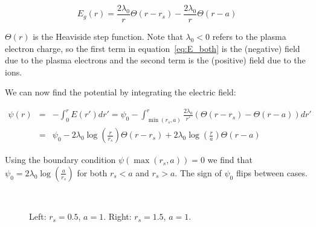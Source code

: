 \documentclass[aps,prl,preprint,groupedaddress]{revtex4-1}
\begin{document}
\begin{equation}\label{eq:E_both}
E_g(r) = \frac{2\lambda_0}{r}\Theta(r-r_s) - \frac{2\lambda_0}{r}\Theta(r-a)
\end{equation}

$\Theta(r)$ is the Heaviside step function. Note that $\lambda_0 < 0$ refers to the plasma electron charge, so the first term in equation~\ref{eq:E_both} is the (negative) field due to the plasma electrons and the second term is the (positive) field due to the ions.

We can now find the potential by integrating the electric field:

\begin{equation}\label{eq:Psi_both}
\begin{array}{rcl}
\psi(r) & = & -\int_0^r E(r') dr' = \psi_0 - \int_{\min(r_s,a)}^r \frac{2\lambda_0}{r'}\left(\Theta(r-r_s) - \Theta(r-a)\right) dr' \\
& = & \psi_0 - 2\lambda_0\log\left(\frac{r}{r_s}\right)\Theta(r-r_s) + 2\lambda_0\log\left(\frac{r}{a}\right)\Theta(r-a)
\end{array}
\end{equation}

Using the boundary condition $\psi(\max(r_s,a)) = 0$ we find that $\psi_0 = 2\lambda_0 \log\left(\frac{a}{r_s}\right)$ for both $r_s < a$ and $r_s > a$. The sign of $\psi_0$ flips between cases. 


\begin{figure}
\centering
\mbox{\quad
{}}
\caption{Left: $r_s = 0.5$, $a=1$. Right: $r_s = 1.5$, $a=1$.} \label{fig12}
\end{figure}
\end{document}
